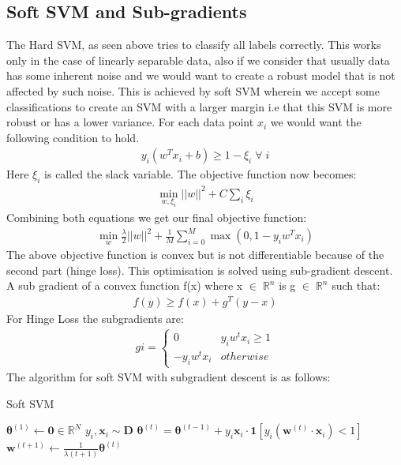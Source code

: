 \documentclass[11pt]{article}
\DeclareMathOperator*{\minimize}{min}
\begin{document}
\subsection{Soft SVM and Sub-gradients}
The Hard SVM, as seen above tries to classify all labels correctly. This works only in the case of linearly separable data, also if we consider that usually data has some inherent noise and we would want to create a robust model that is not affected by such noise. This is achieved by soft SVM wherein we accept some classifications to create an SVM with a larger margin i.e that this SVM is more robust or has a lower variance. For each data point $x_i$ we would want the following condition to hold.
\begin{align}
    y_i(w^Tx_i + b) \ge 1 - \xi_i \; \forall \; i
\end{align}
Here $\xi_i$ is called the slack variable. The objective function now becomes:
\begin{align}
    \minimize_{w,\xi_i} ||w||^2 + C \sum_{i}\xi_i
\end{align}
Combining both equations we get our final objective function:
\begin{align}
    \minimize_{w} \frac{\lambda}{2}||w||^2 + \frac{1}{M} \sum_{i=0}^{M}\max(0, 1 - y_iw^Tx_i)
\end{align}
The above objective function is convex but is not differentiable because of the second part (hinge loss). This optimisation is solved using sub-gradient descent. A sub gradient of a convex function f(x) where x $\in\; \mathbb{R}^n$ is g $\in \; \mathbb{R}^n$ such that:
\begin{align}
    f(y) \ge f(x) + g^T(y-x)
\end{align}
For Hinge Loss the subgradients are:
\begin{align}
    gi = \begin{cases}
    0 & y_iw^tx_i \geq 1 \\
    -y_iw^tx_i  & otherwise
    \end{cases}
\end{align}
The algorithm for soft SVM with subgradient descent is as follows:

\begin{algorithm}[H]
\caption{Soft SVM}
\label{algo:soft-svm}
\begin{algorithmic}[1]
\STATE $\boldsymbol{\theta}^{(1)} \leftarrow \mathbf{0} \in \mathbb{R}^N$
\STATE $y_i, \boldsymbol{x}_i \sim \boldsymbol{D}$
\STATE $\boldsymbol{\theta}^{(t)} = \boldsymbol{\theta}^{(t-1)} + y_i \boldsymbol{x}_i \cdot \mathbf{1} [y_i (\boldsymbol{w}^{(t)} \cdot \boldsymbol{x}_i) < 1]$
\STATE $\boldsymbol{w}^{(t+1)} \leftarrow \frac{1}{\lambda(t+1)} \boldsymbol{\theta}^{(t)}$
\ENDFOR
\end{algorithmic}
\end{algorithm}
\end{document}
